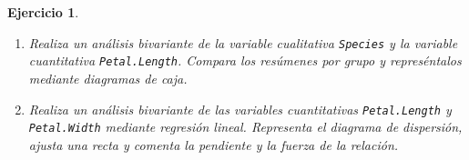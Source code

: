 \documentclass[11pt,a4paper]{article}
\theoremstyle{exercise}
\newtheorem{exercise}{Ejercicio}
\begin{document}
\begin{exercise}
\begin{enumerate}
	\item Realiza un análisis bivariante de la variable cualitativa \texttt{Species} y la variable cuantitativa \texttt{Petal.Length}. Compara los resúmenes por grupo y represéntalos mediante diagramas de caja.

	\item Realiza un análisis bivariante de las variables cuantitativas \texttt{Petal.Length} y \texttt{Petal.Width} mediante regresión lineal. Representa el diagrama de dispersión, ajusta una recta y comenta la pendiente y la fuerza de la relación.
	\end{enumerate}
\end{exercise}
\end{document}
